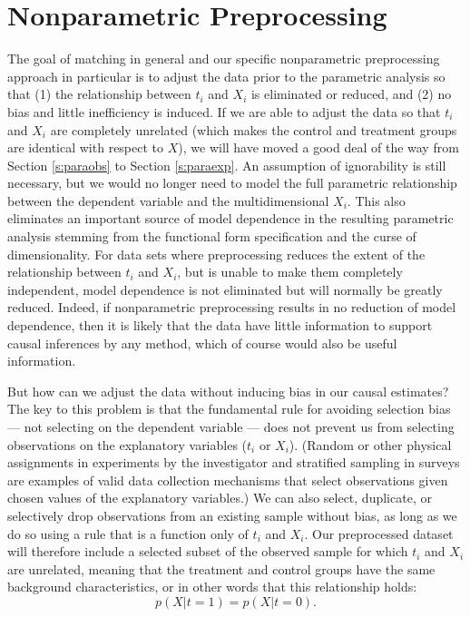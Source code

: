 \documentclass[11pt,titlepage]{article}
\begin{document}
\section{Nonparametric Preprocessing} \label{s:nonparpreproc}

The goal of matching in general and our specific nonparametric
preprocessing approach in particular is to adjust the data prior to
the parametric analysis so that (1) the relationship between $t_i$ and
$X_i$ is eliminated or reduced, and (2) no bias and little
inefficiency is induced.  If we are able to adjust the data so that
$t_i$ and $X_i$ are completely unrelated (which makes the control and
treatment groups are identical with respect to $X$), we will have
moved a good deal of the way from Section \ref{s:paraobs} to Section
\ref{s:paraexp}.  An assumption of ignorability is still necessary,
but we would no longer need to model the full parametric relationship
between the dependent variable and the multidimensional $X_i$.  This
also eliminates an important source of model dependence in the
resulting parametric analysis stemming from the functional form
specification and the curse of dimensionality.  For data sets where
preprocessing reduces the extent of the relationship between $t_i$ and
$X_i$, but is unable to make them completely independent, model
dependence is not eliminated but will normally be greatly reduced.
Indeed, if nonparametric preprocessing results in no reduction of
model dependence, then it is likely that the data have little
information to support causal inferences by any method, which of
course would also be useful information.

But how can we adjust the data without inducing bias in our causal
estimates?  The key to this problem is that the fundamental rule for
avoiding selection bias --- not selecting on the dependent variable
--- does not prevent us from selecting observations on the explanatory
variables ($t_i$ or $X_i$).  (Random or other physical assignments in
experiments by the investigator and stratified sampling in surveys are
examples of valid data collection mechanisms that select observations
given chosen values of the explanatory variables.)  We can also
select, duplicate, or selectively drop observations from an existing
sample without bias, as long as we do so using a rule that is a
function only of $t_i$ and $X_i$.  Our preprocessed dataset will
therefore include a selected subset of the observed sample for which
$t_i$ and $X_i$ are unrelated, meaning that the treatment and control
groups have the same background characteristics, or in other words
that this relationship holds:
\begin{equation}
  \label{balance}
  p(X|t=1) = p(X|t=0).
\end{equation}
\end{document}
